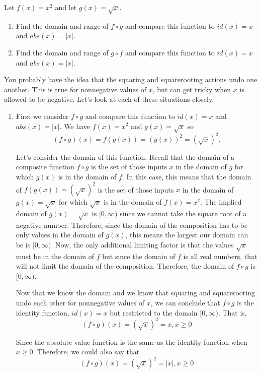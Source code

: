 \documentclass{ximera}
\begin{document}
\begin{example}
Let $f(x)=x^2$ and let $g(x)=\sqrt{x}$.  
\begin{enumerate}[label=\alph*.]
\item Find the domain and range of $f \circ g$ and compare this function to $id(x)=x$ and $abs(x)=|x|$.
\item Find the domain and range of $g \circ f$ and compare this function to $id(x)=x$ and $abs(x)=|x|$.
\end{enumerate}

\begin{explanation}
You probably have the idea that the squaring and squarerooting actions undo one another.  This is true for nonnegative values of $x$, but can get tricky when $x$ is allowed to be negative.  Let's look at each of these situations closely.
\begin{enumerate}[label=\alph*.]
\item First we consider $f \circ g$ and compare this function to $id(x)=x$ and $abs(x)=|x|$.  We have $f(x)=x^2$ and $g(x)=\sqrt{x}$ so 
$$(f \circ g)(x) = f(g(x))=(g(x))^2=(\sqrt{x})^2.$$ 

Let's consider the domain of this function.  Recall that the domain of a composite function $f \circ g$ is the set of those inputs $x$ in the domain of $g$ for which $g(x)$ is in the domain of $f$.  In this case, this means that the domain of $f(g(x))=(\sqrt{x})^2$ is the set of those inputs $x$ in the domain of $g(x)=\sqrt{x}$ for which $\sqrt{x}$ is in the domain of $f(x)=x^2$.  The implied domain of $g(x)=\sqrt{x}$ is $[0,\infty)$ since we cannot take the square root of a negative number.  Therefore, since the domain of the composition has to be only values in the domain of $g(x)$, this means the largest our domain can be is $[0,\infty)$.  Now, the only additional limiting factor is that the values $\sqrt{x}$ must be in the domain of $f$ but since the domain of $f$ is all real numbers, that will not limit the domain of the composition.  Therefore, the domain of $f \circ g$ is  $[0,\infty)$.

Now that we know the domain and we know that squaring and squarerooting undo each other for nonnegative values of $x$, we can conclude that $f \circ g$ is the identity function, $id(x)=x$ but restricted to the domain $[0,\infty)$.  That is,
$$(f \circ g)(x) =  (\sqrt{x})^2 = x, x \geq 0$$

Since the absolute value function is the same as the identity function when $x \geq 0$.  Therefore, we could also say that 
$$(f \circ g)(x) =  (\sqrt{x})^2 = |x|, x \geq 0$$


\end{enumerate}
\end{explanation}
\end{example}
\end{document}
